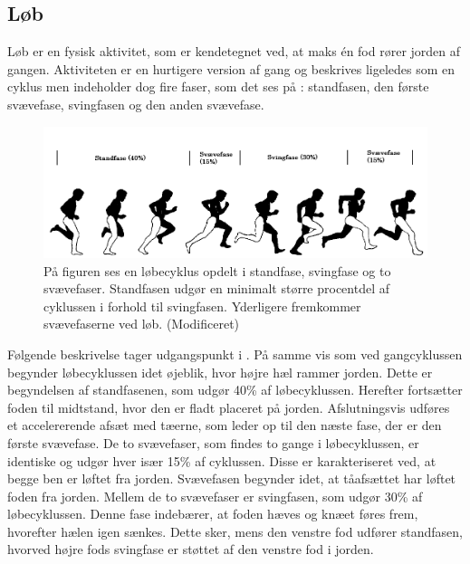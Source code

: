 \subsection{Løb}
Løb er en fysisk aktivitet, som er kendetegnet ved, at maks én fod rører jorden af gangen. Aktiviteten er en hurtigere version af gang og beskrives ligeledes som en cyklus men indeholder dog fire faser, som det ses på : standfasen, den første svævefase, svingfasen og den anden svævefase. \citep{Adelaar1986,Novacheck1998}
\begin{figure}[H]
	\centering
	\includegraphics[scale=0.4]{figures/bProblemloesning/loeb_cyklus1.png}
	\caption{På figuren ses en løbecyklus opdelt i standfase, svingfase og to svævefaser. Standfasen udgør en minimalt større procentdel af cyklussen i forhold til svingfasen. Yderligere fremkommer svævefaserne ved løb. \citep{Adelaar1986} (Modificeret)}
	\label{fig:loebecyklus}
\end{figure}
Følgende beskrivelse tager udgangspunkt i . På samme vis som ved gangcyklussen begynder løbecyklussen idet øjeblik, hvor højre hæl rammer jorden. Dette er begyndelsen af standfasenen, som udgør 40\% af løbecyklussen. Herefter fortsætter foden til midtstand, hvor den er fladt placeret på jorden. Afslutningsvis udføres et accelererende afsæt med tæerne, som leder op til den næste fase, der er den første svævefase. \citep{Adelaar1986,Novacheck1998} \newline 
De to svævefaser, som findes to gange i løbecyklussen, er identiske og udgør hver især 15\% af cyklussen. Disse er karakteriseret ved, at begge ben er løftet fra jorden. \citep{Adelaar1986,Novacheck1998} Svævefasen begynder idet, at tåafsættet har løftet foden fra jorden. Mellem de to svævefaser er svingfasen, som udgør 30\% af løbecyklussen. Denne fase indebærer, at foden hæves og knæet føres frem, hvorefter hælen igen sænkes. Dette sker, mens den venstre fod udfører standfasen, hvorved højre fods svingfase er støttet af den venstre fod i jorden. \citep{Adelaar1986,Novacheck1998} %

